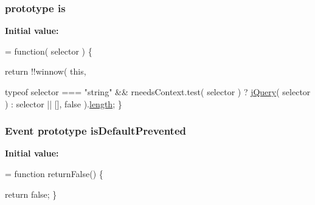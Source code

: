 \subsubsection[{is}]{ {\bf prototype} is}\label{jquery-1_810_82-vsdoc_8js_ab09af0fb8923d70813f6d128591d1962}
{\bfseries Initial value\+:}
\begin{DoxyCode}
= \textcolor{keyword}{function}( selector ) \{


        \textcolor{keywordflow}{return} !!winnow(
            \textcolor{keyword}{this},

            
            
            typeof selector === \textcolor{stringliteral}{"string"} && rneedsContext.test( selector ) ?
                \hyperlink{jquery-1_810_82-vsdoc_8js_add5237586d970a38a81f990e8eb28c6c}{jQuery}( selector ) :
                selector || [],
            false
        ).\hyperlink{jquery-1_810_82-vsdoc_8js_aa7de35d58da66d9944ab9cbe82c19640}{length};
    \}
\end{DoxyCode}
\hypertarget{jquery-1_810_82-vsdoc_8js_af36c584d7af0deb379b8d6e3116775cc}{}
\subsubsection[{is\+Default\+Prevented}]{ {\bf Event} {\bf prototype} is\+Default\+Prevented}\label{jquery-1_810_82-vsdoc_8js_af36c584d7af0deb379b8d6e3116775cc}
{\bfseries Initial value\+:}
\begin{DoxyCode}
= \textcolor{keyword}{function} returnFalse() \{


    \textcolor{keywordflow}{return} \textcolor{keyword}{false};
\}
\end{DoxyCode}
\hypertarget{jquery-1_810_82-vsdoc_8js_aaf2bcef7602f40b9d2e1d70f197e44d1}{}

